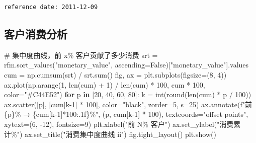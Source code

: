 \documentclass[
]{ctexart}
\newenvironment{Shaded}{\begin{snugshade}}{\end{snugshade}}
\newcommand{\BuiltInTok}[1]{\textcolor[rgb]{0.00,0.23,0.31}{#1}}
\newcommand{\CommentTok}[1]{\textcolor[rgb]{0.37,0.37,0.37}{#1}}
\newcommand{\ControlFlowTok}[1]{\textcolor[rgb]{0.00,0.23,0.31}{\textbf{#1}}}
\newcommand{\DecValTok}[1]{\textcolor[rgb]{0.68,0.00,0.00}{#1}}
\newcommand{\KeywordTok}[1]{\textcolor[rgb]{0.00,0.23,0.31}{\textbf{#1}}}
\newcommand{\NormalTok}[1]{\textcolor[rgb]{0.00,0.23,0.31}{#1}}
\newcommand{\OperatorTok}[1]{\textcolor[rgb]{0.37,0.37,0.37}{#1}}
\newcommand{\SpecialCharTok}[1]{\textcolor[rgb]{0.37,0.37,0.37}{#1}}
\newcommand{\SpecialStringTok}[1]{\textcolor[rgb]{0.13,0.47,0.30}{#1}}
\newcommand{\StringTok}[1]{\textcolor[rgb]{0.13,0.47,0.30}{#1}}
\newcommand{\VariableTok}[1]{\textcolor[rgb]{0.07,0.07,0.07}{#1}}
\begin{document}
\begin{verbatim}
reference date: 2011-12-09
\end{verbatim}

\subsection{客户消费分析}\label{ux5ba2ux6237ux6d88ux8d39ux5206ux6790}

\begin{Shaded}
\begin{Highlighting}[]

\CommentTok{\# 集中度曲线，前 x\% 客户贡献了多少消费}
\NormalTok{srt }\OperatorTok{=}\NormalTok{ rfm.sort\_values(}\StringTok{"monetary\_value"}\NormalTok{, ascending}\OperatorTok{=}\VariableTok{False}\NormalTok{)[}\StringTok{"monetary\_value"}\NormalTok{].values}
\NormalTok{cum }\OperatorTok{=}\NormalTok{ np.cumsum(srt) }\OperatorTok{/}\NormalTok{ srt.}\BuiltInTok{sum}\NormalTok{()}
\NormalTok{fig, ax }\OperatorTok{=}\NormalTok{ plt.subplots(figsize}\OperatorTok{=}\NormalTok{(}\DecValTok{8}\NormalTok{, }\DecValTok{4}\NormalTok{))}
\NormalTok{ax.plot(np.arange(}\DecValTok{1}\NormalTok{, }\BuiltInTok{len}\NormalTok{(cum) }\OperatorTok{+} \DecValTok{1}\NormalTok{) }\OperatorTok{/} \BuiltInTok{len}\NormalTok{(cum) }\OperatorTok{*} \DecValTok{100}\NormalTok{, cum }\OperatorTok{*} \DecValTok{100}\NormalTok{, color}\OperatorTok{=}\StringTok{"\#C44E52"}\NormalTok{)}
\ControlFlowTok{for}\NormalTok{ p }\KeywordTok{in}\NormalTok{ [}\DecValTok{20}\NormalTok{, }\DecValTok{40}\NormalTok{, }\DecValTok{60}\NormalTok{, }\DecValTok{80}\NormalTok{]:}
\NormalTok{    k }\OperatorTok{=} \BuiltInTok{int}\NormalTok{(}\BuiltInTok{round}\NormalTok{(}\BuiltInTok{len}\NormalTok{(cum) }\OperatorTok{*}\NormalTok{ p }\OperatorTok{/} \DecValTok{100}\NormalTok{))}
\NormalTok{    ax.scatter([p], [cum[k}\OperatorTok{{-}}\DecValTok{1}\NormalTok{] }\OperatorTok{*} \DecValTok{100}\NormalTok{], color}\OperatorTok{=}\StringTok{"black"}\NormalTok{, zorder}\OperatorTok{=}\DecValTok{5}\NormalTok{, s}\OperatorTok{=}\DecValTok{25}\NormalTok{)}
\NormalTok{    ax.annotate(}\SpecialStringTok{f"前 }\SpecialCharTok{\{}\NormalTok{p}\SpecialCharTok{\}}\SpecialStringTok{\% → }\SpecialCharTok{\{}\NormalTok{cum[k}\OperatorTok{{-}}\DecValTok{1}\NormalTok{]}\OperatorTok{*}\DecValTok{100}\SpecialCharTok{:.1f\}}\SpecialStringTok{\%"}\NormalTok{, (p, cum[k}\OperatorTok{{-}}\DecValTok{1}\NormalTok{] }\OperatorTok{*} \DecValTok{100}\NormalTok{),}
\NormalTok{                textcoords}\OperatorTok{=}\StringTok{"offset points"}\NormalTok{, xytext}\OperatorTok{=}\NormalTok{(}\DecValTok{6}\NormalTok{, }\OperatorTok{{-}}\DecValTok{12}\NormalTok{), fontsize}\OperatorTok{=}\DecValTok{9}\NormalTok{)}
\NormalTok{plt.xlabel(}\StringTok{"前 N\% 客户"}\NormalTok{) }
\NormalTok{ax.set\_ylabel(}\StringTok{"消费累计\%"}\NormalTok{)}
\NormalTok{ax.set\_title(}\StringTok{"消费集中度曲线 ii"}\NormalTok{)}
\NormalTok{fig.tight\_layout()}
\NormalTok{plt.show()}
\end{Highlighting}
\end{Shaded}
\end{document}
